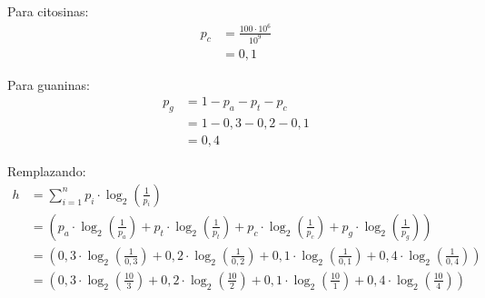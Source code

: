 \documentclass{templateNote}
\begin{document}
\begin{enumerate}
    \begin{minipage}{0.45\textwidth}
    Para citosinas:
    \begin{align*}
        p_{c} &= \frac{100 \cdot 10^6}{10^9} \\
        &= 0,1
    \end{align*}
    \end{minipage}
    \hfill
    \begin{minipage}{0.45\textwidth}
    Para guaninas:
    \begin{align*}
        p_{g} &= 1 - p_{a} - p_{t} - p_{c} \\
        &= 1 - 0,3 - 0,2 - 0,1 \\
        &= 0,4
    \end{align*}
    \end{minipage}

    Remplazando:
    \begin{align*}
        h &= \sum_{i=1}^{n} p_i \cdot \log_2 \left( \frac{1}{p_i} \right) \\
        &= \left( p_{a} \cdot \log_2 \left( \frac{1}{p_{a}} \right) + p_{t} \cdot \log_2 \left( \frac{1}{p_{t}} \right) + p_{c} \cdot \log_2 \left( \frac{1}{p_{c}} \right) + p_{g} \cdot \log_2 \left( \frac{1}{p_{g}} \right) \right) \\
        &= \left( 0,3 \cdot \log_2 \left( \frac{1}{0,3} \right) + 0,2 \cdot \log_2 \left( \frac{1}{0,2} \right) + 0,1 \cdot \log_2 \left( \frac{1}{0,1} \right) + 0,4 \cdot \log_2 \left( \frac{1}{0,4} \right) \right) \\
        &= \left( 0,3 \cdot \log_2 \left( \frac{10}{3} \right) + 0,2 \cdot \log_2 \left( \frac{10}{2} \right) + 0,1 \cdot \log_2 \left( \frac{10}{1} \right) + 0,4 \cdot \log_2 \left( \frac{10}{4} \right) \right) \\        
    \end{align*}

\end{enumerate}
\end{document}
